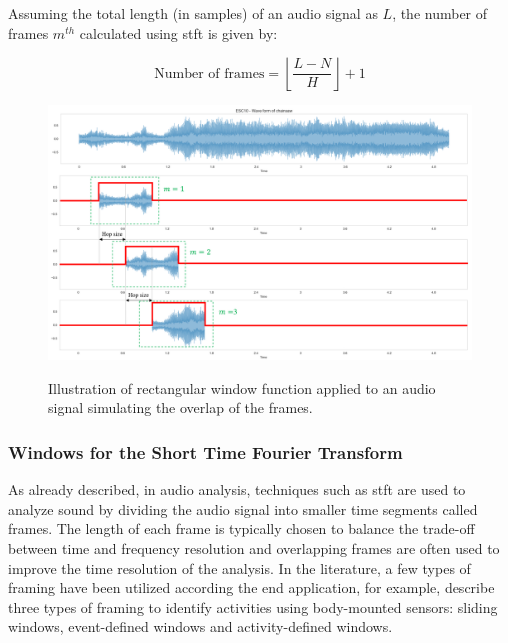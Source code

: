 Assuming the total length (in samples) of an audio signal as $L$, the number of frames $m^{th}$ calculated using \gls{stft} is given by:

\begin{equation}
    \label{eq:frmwk_stft_frames}
    \text{Number of frames} = \left\lfloor \frac{L-N}{H} \right\rfloor + 1
\end{equation}

\begin{figure}[htbp]
    \raggedright
        \caption{Illustration of rectangular window function applied to an audio signal simulating the overlap of the frames.}
        \includegraphics[width=1.0\textwidth]{resources/images/030-theoretical_framework/Framework_stft_windowing.png}
        \label{fig:frmwk_stft_windowing}
\end{figure}


\subsubsection{Windows for the Short Time Fourier Transform}
\label{subsubsec:audio_fundamentals_windowing_techniques}

As already described, in audio analysis, techniques such as \gls{stft} are used to analyze sound by dividing the audio signal into smaller time segments called frames.  The length of each frame is typically chosen to balance the trade-off between time and frequency resolution and overlapping frames are often used to improve the time resolution of the analysis. In the literature, a few types of framing have been utilized according the end application, for example, \textcite{Preece2009} describe three types of framing to identify activities using body-mounted sensors: sliding windows, event-defined windows and activity-defined windows.

